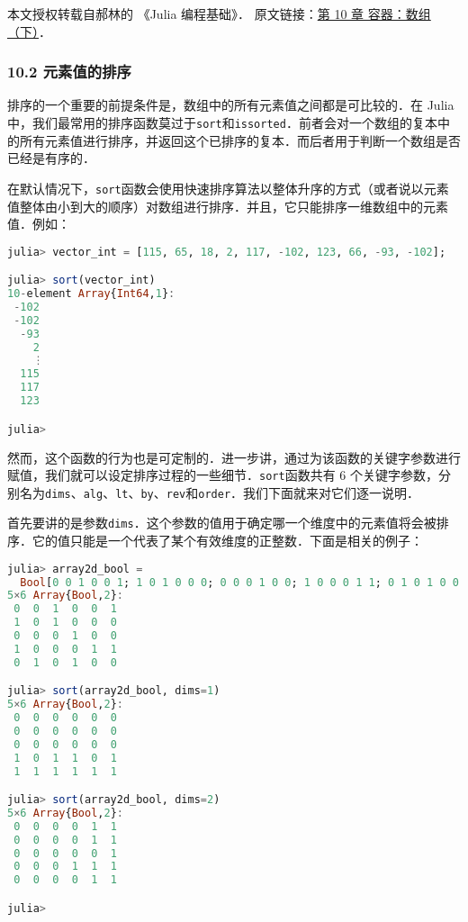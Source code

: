 
本文授权转载自郝林的 《Julia 编程基础》． 原文链接：\href{https://github.com/hyper0x/JuliaBasics/blob/master/book/ch10.md}{第 10 章 容器：数组（下）}．


\subsubsection{10.2 元素值的排序}

排序的一个重要的前提条件是，数组中的所有元素值之间都是可比较的．在 Julia 中，我们最常用的排序函数莫过于\verb|sort|和\verb|issorted|．前者会对一个数组的复本中的所有元素值进行排序，并返回这个已排序的复本．而后者用于判断一个数组是否已经是有序的．

在默认情况下，\verb|sort|函数会使用快速排序算法以整体升序的方式（或者说以元素值整体由小到大的顺序）对数组进行排序．并且，它只能排序一维数组中的元素值．例如：

\begin{lstlisting}[language=julia]
julia> vector_int = [115, 65, 18, 2, 117, -102, 123, 66, -93, -102];

julia> sort(vector_int)
10-element Array{Int64,1}:
 -102
 -102
  -93
    2
    ⋮
  115
  117
  123

julia>
\end{lstlisting}

然而，这个函数的行为也是可定制的．进一步讲，通过为该函数的关键字参数进行赋值，我们就可以设定排序过程的一些细节．\verb|sort|函数共有 6 个关键字参数，分别名为\verb|dims|、\verb|alg|、\verb|lt|、\verb|by|、\verb|rev|和\verb|order|．我们下面就来对它们逐一说明．

首先要讲的是参数\verb|dims|．这个参数的值用于确定哪一个维度中的元素值将会被排序．它的值只能是一个代表了某个有效维度的正整数．下面是相关的例子：

\begin{lstlisting}[language=julia]
julia> array2d_bool = 
  Bool[0 0 1 0 0 1; 1 0 1 0 0 0; 0 0 0 1 0 0; 1 0 0 0 1 1; 0 1 0 1 0 0]
5×6 Array{Bool,2}:
 0  0  1  0  0  1
 1  0  1  0  0  0
 0  0  0  1  0  0
 1  0  0  0  1  1
 0  1  0  1  0  0

julia> sort(array2d_bool, dims=1)
5×6 Array{Bool,2}:
 0  0  0  0  0  0
 0  0  0  0  0  0
 0  0  0  0  0  0
 1  0  1  1  0  1
 1  1  1  1  1  1

julia> sort(array2d_bool, dims=2)
5×6 Array{Bool,2}:
 0  0  0  0  1  1
 0  0  0  0  1  1
 0  0  0  0  0  1
 0  0  0  1  1  1
 0  0  0  0  1  1

julia> 
\end{lstlisting}

